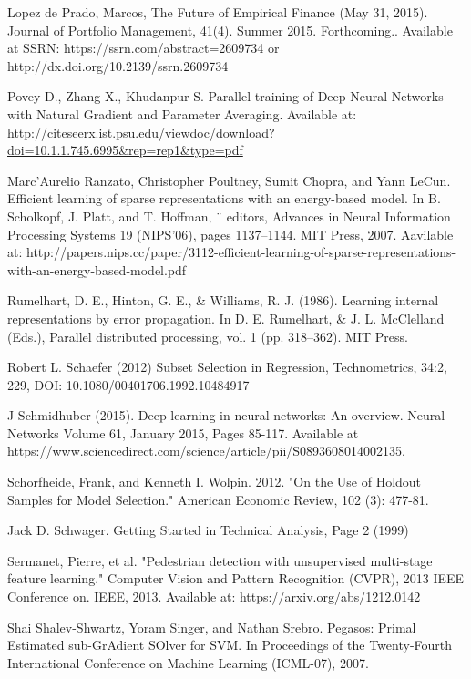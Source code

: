 \documentclass[a4paper,11pt,oneside]{article}
\theoremstyle{plain}
\theoremstyle{definition}
\begin{document}
\begin{thebibliography}{bibliography}
Lopez de Prado, Marcos, The Future of Empirical Finance (May 31, 2015). Journal of Portfolio Management, 41(4). Summer 2015. Forthcoming.. Available at SSRN: https://ssrn.com/abstract=2609734 or http://dx.doi.org/10.2139/ssrn.2609734

Povey D., Zhang X., Khudanpur S. Parallel training of Deep Neural Networks with Natural Gradient and Parameter Averaging. Available at: \url{http://citeseerx.ist.psu.edu/viewdoc/download?doi=10.1.1.745.6995&rep=rep1&type=pdf}

Marc’Aurelio Ranzato, Christopher Poultney, Sumit Chopra, and Yann LeCun. Efficient learning of sparse representations with an energy-based model. In B. Scholkopf, J. Platt, and T. Hoffman, ¨ editors, Advances in Neural Information Processing Systems 19 (NIPS’06), pages 1137–1144. MIT Press, 
2007. Aavilable at: http://papers.nips.cc/paper/3112-efficient-learning-of-sparse-representations-with-an-energy-based-model.pdf

Rumelhart, D. E., Hinton, G. E., \& Williams, R. J. (1986). Learning internal representations by error propagation. In D. E. Rumelhart, \& J. L. McClelland (Eds.), Parallel distributed processing, vol. 1 (pp. 318–362). MIT Press.

Robert L. Schaefer (2012) Subset Selection in Regression, Technometrics, 34:2, 229, DOI: 10.1080/00401706.1992.10484917
  
J Schmidhuber (2015). Deep learning in neural networks: An overview. Neural Networks Volume 61, January 2015, Pages 
85-117. Available at https://www.sciencedirect.com/science/article/pii/S0893608014002135. 
  
Schorfheide, Frank, and Kenneth I. Wolpin. 2012. "On the Use of Holdout Samples for Model Selection." American Economic Review, 102 (3): 477-81.

Jack D. Schwager. Getting Started in Technical Analysis, Page 2 (1999)


Sermanet, Pierre, et al. "Pedestrian detection with unsupervised multi-stage feature learning." Computer Vision and Pattern Recognition (CVPR), 2013 IEEE Conference on. IEEE, 2013.
Available at: https://arxiv.org/abs/1212.0142

Shai Shalev-Shwartz, Yoram Singer, and Nathan Srebro. Pegasos: Primal Estimated sub-GrAdient SOlver for SVM. In Proceedings of the Twenty-Fourth International Conference on Machine Learning (ICML-07), 2007.


\end{thebibliography}
\end{document}
